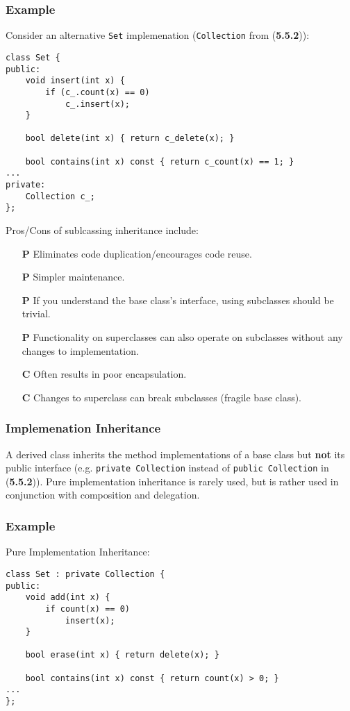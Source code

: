 \documentclass{article}
\begin{document}
\subsubsection*{Example}
Consider an alternative \texttt{Set} implemenation
(\texttt{Collection} from (\textbf{5.5.2})):
\begin{verbatim}
class Set {
public:
    void insert(int x) {
        if (c_.count(x) == 0)
            c_.insert(x);
    }

    bool delete(int x) { return c_delete(x); }

    bool contains(int x) const { return c_count(x) == 1; }
...
private:
    Collection c_;
};
\end{verbatim}
Pros/Cons of sublcassing inheritance include:
\begin{enumerate}
\item [\textbf{P}] Eliminates code duplication/encourages code reuse.
\item [\textbf{P}] Simpler maintenance.
\item [\textbf{P}] If you understand the base class's interface, using
  subclasses should be trivial.
\item [\textbf{P}] Functionality on superclasses can also operate on
  subclasses without any changes to implementation.
\item [\textbf{C}] Often results in poor encapsulation.
\item [\textbf{C}] Changes to superclass can break subclasses (fragile
  base class).
\end{enumerate}

\subsubsection{Implemenation Inheritance}
A derived class inherits the method implementations of a base class
but \textbf{not} its public interface (e.g. \texttt{private
  Collection} instead of \texttt{public Collection} in
(\textbf{5.5.2})). Pure implementation inheritance is rarely used, but
is rather used in conjunction with composition and delegation.

\subsubsection*{Example}
Pure Implementation Inheritance:
\begin{verbatim}
class Set : private Collection {
public:
    void add(int x) {
        if count(x) == 0)
            insert(x);
    }

    bool erase(int x) { return delete(x); }

    bool contains(int x) const { return count(x) > 0; }
...
};
\end{verbatim}
\end{document}

